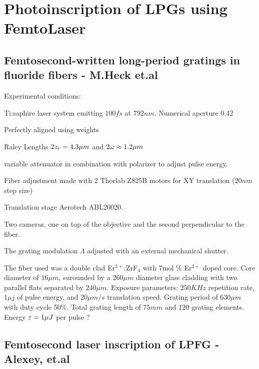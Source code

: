 \documentclass[11pt, openright]{book}
\begin{document}


    \thispagestyle{head}

     \section*{Photoinscription of LPGs using FemtoLaser}

      \subsection*{Femtosecond-written long-period gratings in fluoride fibers - M.Heck et.al}

    Experimental conditions: 
     \begin{items}[-3pt]{-15pt}{-15pt}
        \item Ti:saphire laser system emitting $100fs$ at $792nm$. Numerical aperture 0.42
        \item Perfectly aligned using weights
        \item Raley Lengths $\displaystyle{2z_r=4.3\mu m}$ and $\displaystyle{2\omega\approx1.2\mu m}$
        \item variable attenuator in combination with polarizer to adjust pulse energy. 
        \item Fiber adjustment made with 2 Thorlab Z825B motors for XY translation ($20nm$ step size)
        \item Translation stage Aerotech ABL20020. 
        \item Two cameras, one on top of the objective and the second perpendicular to the fiber.
        \item The grating modulation $\Lambda$ adjusted with an external mechanical shutter. 
    \end{items}

    The fiber used was a double clad  Er$^{3+}$:ZrF$_4$ with 7mol \% Er$^{3+}$ doped core. Core diameter of $16\mu m$, surounded by a $260\mu m$ diameter glass cladding with two parallel flats separated by $240\mu m$.
    Exposure parameters: $250KHz$ repetition rate, $1\mu j$ of pulse energy, and $20\mu m/s$ translation speed. Grating period of $630\mu m$ with duty cycle 50\%. Total grating length of $75mm$ and $120$ grating elements. Energy $\displaystyle{\varepsilon=1\mu J}$ per pulse ? 

     \subsection*{Femtosecond laser inscription of LPFG - Alexey, et.al}
\end{document}
